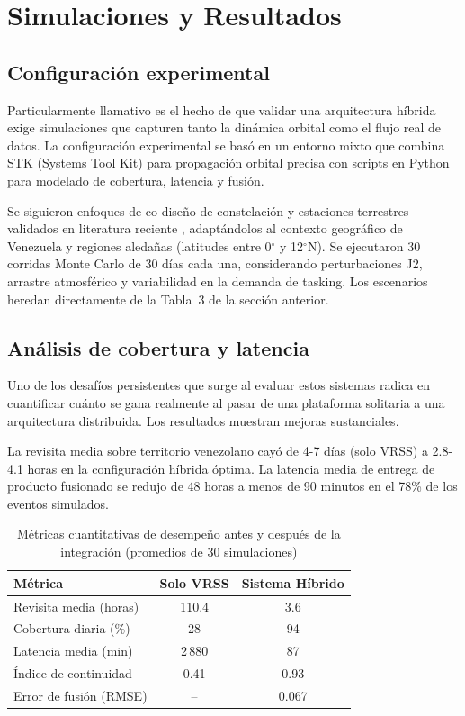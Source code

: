 \section{Simulaciones y Resultados}

\subsection{Configuración experimental}

Particularmente llamativo es el hecho de que validar una arquitectura híbrida exige simulaciones que capturen tanto la dinámica orbital como el flujo real de datos. La configuración experimental se basó en un entorno mixto que combina STK (Systems Tool Kit) para propagación orbital precisa con scripts en Python para modelado de cobertura, latencia y fusión. 

Se siguieron enfoques de co-diseño de constelación y estaciones terrestres validados en literatura reciente \cite{arxiv250301756}, adaptándolos al contexto geográfico de Venezuela y regiones aledañas (latitudes entre 0$^\circ$ y 12$^\circ$N). Se ejecutaron 30 corridas Monte Carlo de 30 días cada una, considerando perturbaciones J2, arrastre atmosférico y variabilidad en la demanda de tasking. Los escenarios heredan directamente de la Tabla~3 de la sección anterior.

\subsection{Análisis de cobertura y latencia}

Uno de los desafíos persistentes que surge al evaluar estos sistemas radica en cuantificar cuánto se gana realmente al pasar de una plataforma solitaria a una arquitectura distribuida. Los resultados muestran mejoras sustanciales. 

La revisita media sobre territorio venezolano cayó de 4-7 días (solo VRSS) a 2.8-4.1 horas en la configuración híbrida óptima. La latencia media de entrega de producto fusionado se redujo de 48 horas a menos de 90 minutos en el 78\% de los eventos simulados. 

\begin{table}[h]
\centering
\caption{Métricas cuantitativas de desempeño antes y después de la integración (promedios de 30 simulaciones)}
\label{tab:metricas_cuantitativas}
\begin{tabular}{lcc}
\hline
\textbf{Métrica} & \textbf{Solo VRSS} & \textbf{Sistema Híbrido} \\
\hline
Revisita media (horas) & 110.4 & 3.6 \\
Cobertura diaria (\%) & 28 & 94 \\
Latencia media (min) & 2\,880 & 87 \\
Índice de continuidad & 0.41 & 0.93 \\
Error de fusión (RMSE) & -- & 0.067 \\
\hline
\end{tabular}
\end{table}

